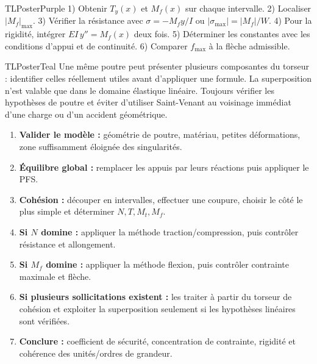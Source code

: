 \documentclass[10pt,a3paper]{article}
\begin{document}
\begin{minipage}[t]{0.49\linewidth}
\begin{TLPosterBloc}{TLPosterPurple}
1) Obtenir $T_y(x)$ et $M_f(x)$ sur chaque intervalle. 2) Localiser $|M_f|_{\max}$. 3) Vérifier la résistance avec $\sigma=-M_fy/I$ ou $|\sigma_{\max}|=|M_f|/W$. 4) Pour la rigidité, intégrer $EI\,y''=M_f(x)$ deux fois. 5) Déterminer les constantes avec les conditions d'appui et de continuité. 6) Comparer $f_{\max}$ à la flèche admissible.
\end{TLPosterBloc}
\begin{TLPosterBloc}{TLPosterTeal}
Une même poutre peut présenter plusieurs composantes du torseur : identifier celles réellement utiles avant d'appliquer une formule. La superposition n'est valable que dans le domaine élastique linéaire. Toujours vérifier les hypothèses de poutre et éviter d'utiliser Saint-Venant au voisinage immédiat d'une charge ou d'un accident géométrique.
\end{TLPosterBloc}
\end{minipage}
\vfill
\begin{TLPosterMethode}
\begin{enumerate}
  \item \textbf{Valider le modèle :} géométrie de poutre, matériau, petites déformations, zone suffisamment éloignée des singularités.
  \item \textbf{Équilibre global :} remplacer les appuis par leurs réactions puis appliquer le PFS.
  \item \textbf{Cohésion :} découper en intervalles, effectuer une coupure, choisir le côté le plus simple et déterminer $N,T,M_t,M_f$.
  \item \textbf{Si $N$ domine :} appliquer la méthode traction/compression, puis contrôler résistance et allongement.
  \item \textbf{Si $M_f$ domine :} appliquer la méthode flexion, puis contrôler contrainte maximale et flèche.
  \item \textbf{Si plusieurs sollicitations existent :} les traiter à partir du torseur de cohésion et exploiter la superposition seulement si les hypothèses linéaires sont vérifiées.
  \item \textbf{Conclure :} coefficient de sécurité, concentration de contrainte, rigidité et cohérence des unités/ordres de grandeur.
\end{enumerate}
\end{TLPosterMethode}
\vfill
{}
\end{document}
